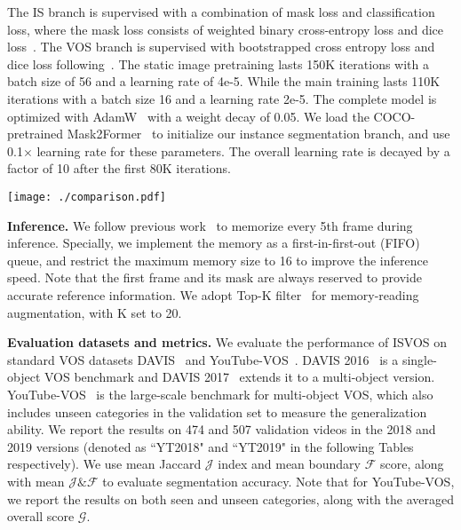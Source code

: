 \documentclass[10pt,twocolumn,letterpaper]{article}
\newcommand{\system}{ISVOS\xspace}
\begin{document}
The IS branch is supervised with a combination of mask loss and classification loss, where the mask loss consists of weighted binary cross-entropy loss and dice loss~\cite{milletari2016v}. The VOS branch is supervised with bootstrapped cross entropy loss and dice loss following~\cite{yang2021associating}. The static image pretraining lasts 150K iterations with a batch size of 56 and a learning rate of 4e-5. While the main training lasts 110K iterations with a batch size 16 and a learning rate 2e-5. The complete model is optimized with AdamW~\cite{kingma2014adam,loshchilov2017decoupled} with a weight decay of 0.05.  We load the COCO-pretrained Mask2Former~\cite{cheng2022masked} to initialize our instance segmentation branch, and use 0.1$\times$ learning rate for these parameters. The overall learning rate is decayed by a factor of 10 after the first 80K iterations.

\begin{figure*}[t]
  \centering
   \texttt{[image: ./comparison.pdf]}
   \vspace{-0.25in}
   \caption{Qualitative comparisons between \system and several state-of-the-art memory-based VOS models, including RDE~\cite{li2022recurrent}, STCN~\cite{cheng2021stcn}, and XMem~\cite{cheng2022xmem}.}
   \label{fig:comparison}
\end{figure*}

\vspace{0.02in}
\noindent \textbf{Inference.} We follow previous work~\cite{oh2019video,seong2020kernelized,cheng2021stcn,cheng2022xmem} to memorize every 5th frame during inference. Specially, we implement the memory as a first-in-first-out (FIFO) queue, and restrict the maximum memory size to 16 to improve the inference speed. Note that the first frame and its mask are always reserved to provide accurate reference information. We adopt Top-K filter~\cite{cheng2021mivos,cheng2021stcn,cheng2022xmem} for memory-reading augmentation, with K set to 20.

\vspace{0.02in}
\noindent \textbf{Evaluation datasets and metrics.} We evaluate the performance of \system on standard VOS datasets DAVIS~\cite{perazzi2016benchmark,pont20172017} and YouTube-VOS~\cite{xu2018YouTube}. DAVIS 2016~\cite{perazzi2016benchmark} is a single-object VOS benchmark and DAVIS 2017~\cite{pont20172017} extends it to a multi-object version. YouTube-VOS~\cite{xu2018YouTube} is the large-scale benchmark for multi-object VOS, which also includes unseen categories in the validation set to measure the generalization ability. We report the results on 474 and 507 validation videos in the 2018 and 2019 versions (denoted as ``YT2018" and ``YT2019" in the following Tables respectively). We use mean Jaccard $\mathcal{J}$ index and mean boundary $\mathcal{F}$ score, along with mean $\mathcal{J\&F}$ to evaluate segmentation accuracy. Note that for YouTube-VOS, we report the results on both seen and unseen categories, along with the averaged overall score $\mathcal{G}$. 
\end{document}
